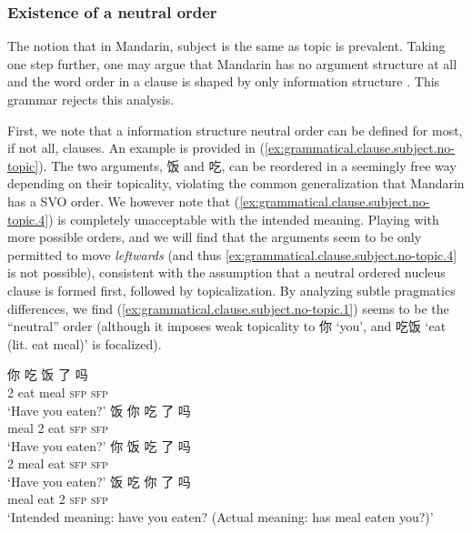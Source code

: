 \documentclass[UTF8, a4paper, oneside, scheme=plain, 12pt]{ctexrep}
\newcommand{\translate}[1]{`#1'}
\newcommand*{\category}[1]{\textsc{#1}}
\begin{document}
\subsubsection{Existence of a neutral order}\label{sec:grammatical.clause.subject.topic}

The notion that in Mandarin, subject is the same as topic is prevalent.
Taking one step further, one may argue that Mandarin has no argument structure at all
and the word order in a clause is shaped by only information structure \citep{lapolla20091}.
This grammar rejects this analysis.

First, we note that a information structure neutral order can be defined for most, if not all, clauses.
An example is provided in (\ref{ex:grammatical.clause.subject.no-topic}).
The two arguments, 饭 and 吃, can be reordered in a seemingly free way depending on their topicality,
violating the common generalization that Mandarin has a SVO order.
We however note that (\ref{ex:grammatical.clause.subject.no-topic.4})
is completely unacceptable with the intended meaning.
Playing with more possible orders, and we will find that the arguments seem to be
only permitted to move \emph{leftwards} (and thus \ref{ex:grammatical.clause.subject.no-topic.4} is not possible),
consistent with the assumption that a neutral ordered nucleus clause is formed first,
followed by topicalization.
By analyzing subtle pragmatics differences, we find (\ref{ex:grammatical.clause.subject.no-topic.1}) seems to be the ``neutral'' order 
(although it imposes weak topicality to 你 \translate{you},
and 吃饭 \translate{eat (lit. eat meal)} is focalized).

\begin{exe}
    \ex\label{ex:grammatical.clause.subject.no-topic} 
    \begin{xlist}
        \ex\label{ex:grammatical.clause.subject.no-topic.1}
        \gll 你 吃 饭 了 吗 \\
        2 eat meal \category{sfp} \category{sfp} \\
        \glt\translate{Have you eaten?} 
        \ex\label{ex:grammatical.clause.subject.no-topic.2}
        \gll 饭 你 吃 了 吗 \\
        meal 2 eat \category{sfp} \category{sfp} \\
        \glt\translate{Have you eaten?}
        \ex\label{ex:grammatical.clause.subject.no-topic.3}
        \gll 你 饭 吃 了 吗 \\
        2 meal eat \category{sfp} \category{sfp} \\
        \glt\translate{Have you eaten?}
        \ex\label{ex:grammatical.clause.subject.no-topic.4}
        \gll *饭 吃 你 了 吗  \\
        meal eat 2 \category{sfp} \category{sfp} \\
        \glt\translate{Intended meaning: have you eaten? (Actual meaning: has meal eaten you?)}
    \end{xlist}
\end{exe}
\end{document}
